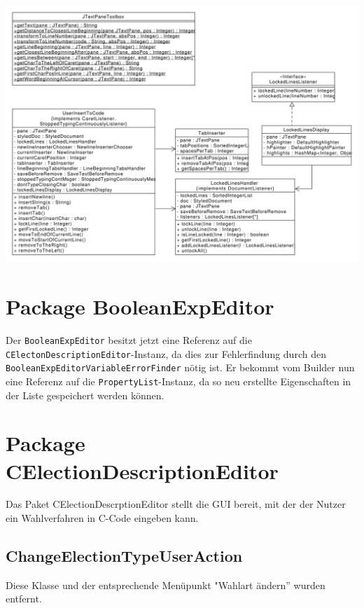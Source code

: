\documentclass[a4paper]{scrreprt}
\begin{document}
\includegraphics[scale=0.45]{inputtocode_update.pdf}

\section{Package BooleanExpEditor}
Der \verb!BooleanExpEditor! besitzt jetzt eine Referenz auf die \verb!CElectonDescriptionEditor!-Instanz, da dies zur Fehlerfindung durch den \verb!BooleanExpEditorVariableErrorFinder! nötig ist.
\newline
Er bekommt vom Builder nun eine Referenz auf die \verb!PropertyList!-Instanz, da so neu erstellte Eigenschaften in der Liste gespeichert werden können.

\section{Package CElectionDescriptionEditor}
Das Paket CElectionDescrptionEditor stellt die GUI bereit, mit der der Nutzer ein Wahlverfahren in C-Code eingeben kann. 

\subsection{ChangeElectionTypeUserAction}
Diese Klasse und der entsprechende Menüpunkt "Wahlart ändern'' wurden entfernt.
\end{document}
